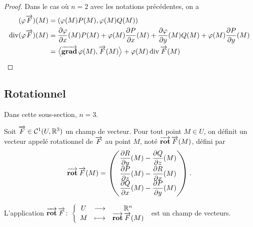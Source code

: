 \begin{proof}
  Dans le cas où \(n=2\) avec les notations précédentes, on a
  \begin{align}
    (\varphi \vect{F})(M)& = (\varphi(M) P(M), \varphi(M) Q(M)) \\
    \divgc(\varphi \vect{F})(M)& = \derivep{\varphi}{x}(M)  P(M) + \varphi(M) \derivep{P}{x}(M) + \derivep{\varphi}{y}(M)  Q(M) + \varphi(M) \derivep{P}{y}(M) \\
                               &=\prodscal{\grad{\varphi}(M)}{\vect{F}(M)} + \varphi(M)\divgc\vect{F}(M)
  \end{align}
\end{proof}

\subsection{Rotationnel}

Dans cette sous-section, \(n=3\).

\begin{defdef}
  Soit \(\vect{F} \in \classe{1}(U, \R^3)\) un champ de vecteur. Pour tout point \(M \in U\), on définit un vecteur appelé rotationnel de \(\vect{F}\) au point \(M\), noté \(\rot \vect{F}(M)\), défini par
  \begin{equation}
    \rot \vect{F}(M) = \begin{pmatrix} \derivep{R}{y}(M) - \derivep{Q}{z}(M) \\ \derivep{P}{z}(M) - \derivep{R}{x}(M) \\ \derivep{Q}{x}(M) - \derivep{P}{y}(M)\end{pmatrix}.
  \end{equation}
\end{defdef}

L'application \(\fonction{\rot \vect{F}}{U}{\R^n}{M}{\rot \vect{F}(M)}\) est un champ de vecteurs.

